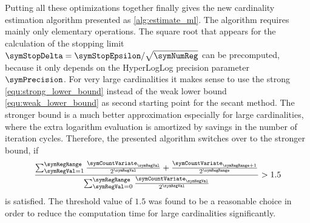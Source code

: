 \documentclass[a4paper]{scrartcl}
\begin{document}
Putting all these optimizations together finally gives the new cardinality estimation algorithm presented as \cref{alg:estimate_ml}. The algorithm requires mainly only elementary operations. The square root that appears for the calculation of the stopping limit $\symStopDelta=\symStopEpsilon/\sqrt{\symNumReg}$ can be precomputed, because it only depends on the HyperLogLog precision parameter $\symPrecision$. 
For very large cardinalities it makes sense to use the strong \eqref{equ:strong_lower_bound} instead of the weak lower bound \eqref{equ:weak_lower_bound} as second starting point for the secant method. The stronger bound is a much better approximation especially for large cardinalities, where the extra logarithm evaluation is amortized by savings in the number of iteration cycles. Therefore, the presented algorithm switches over to the stronger bound, if 
\begin{equation}
\frac{
\sum_{\symRegVal=1}^{\symRegRange}\frac{\symCountVariate_\symRegVal}{2^\symRegVal} + \frac{\symCountVariate_{\symRegRange+1}}{2^\symRegRange}
}{
\sum_{\symRegVal=0}^{\symRegRange}\frac{\symCountVariate_\symRegVal}{2^\symRegVal}
}
> 1.5
\end{equation}
is satisfied. The threshold value of $1.5$ was found to be a reasonable choice in order to reduce the computation time for large cardinalities significantly.
\end{document}
